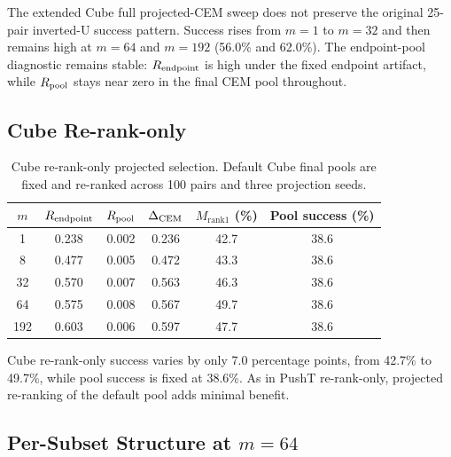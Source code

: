 The extended Cube full projected-CEM sweep does not preserve the original
25-pair inverted-U success pattern.  Success rises from $m=1$ to $m=32$ and
then remains high at $m=64$ and $m=192$ (56.0\% and 62.0\%).  The
endpoint-pool diagnostic remains stable: $R_\text{endpoint}$ is high under the
fixed endpoint artifact, while $R_\text{pool}$ stays near zero in the final CEM
pool throughout.

\subsection{Cube Re-rank-only}
\label{app:stage1b_cube_rerank}

\begin{table}[h]
\centering
\caption{Cube re-rank-only projected selection.  Default Cube final pools
are fixed and re-ranked across 100 pairs and three projection seeds.}
\label{tab:g-cube-rerank}
\small
\begin{tabular}{cccccc}
\toprule
$m$ & $R_\text{endpoint}$ & $R_\text{pool}$ & $\Delta_\text{CEM}$ & $M_{\text{rank1}}$ (\%) & Pool success (\%) \\
\midrule
1 & 0.238 & 0.002 & 0.236 & 42.7 & 38.6 \\
8 & 0.477 & 0.005 & 0.472 & 43.3 & 38.6 \\
32 & 0.570 & 0.007 & 0.563 & 46.3 & 38.6 \\
64 & 0.575 & 0.008 & 0.567 & 49.7 & 38.6 \\
192 & 0.603 & 0.006 & 0.597 & 47.7 & 38.6 \\
\bottomrule
\end{tabular}
\end{table}

Cube re-rank-only success varies by only 7.0 percentage points, from 42.7\%
to 49.7\%, while pool success is fixed at 38.6\%.  As in PushT
re-rank-only, projected re-ranking of the default pool adds minimal benefit.

\subsection{Per-Subset Structure at $m=64$}
\label{app:stage1b_subset_m64}


